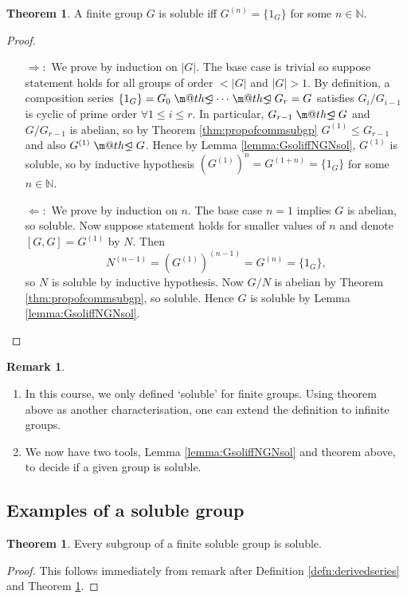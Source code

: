 \documentclass[a4paper]{article}
\makeatletter
\DeclareRobustCommand{\pns}{\mathrel{\text{$\m@th\proper@ideal$}}}
\newcommand{\proper@ideal}{%
  \ooalign{$\lneq$\cr\raise.22ex\hbox{$\lhd$}\cr}%
}
\newcommand{\N}{\mathbb{N}}
\theoremstyle{definition}
\newtheorem{thm}[defn]{Theorem}
\newtheorem*{remark}{Remark}
\makeatother
\begin{document}
\begin{thm}
\label{thm:GsoliffGneq1}
A finite group $G$ is soluble iff $G^{(n)}=\{1_G\}$ for some $n\in\N$.
\end{thm}
\begin{proof}
\begin{itemize}
\item[$\Rightarrow:$] We prove by induction on $|G|$. The base case is trivial so suppose statement holds for all groups of order $<|G|$ and $|G|>1$. By definition, a composition series $\{1_G\}=G_0\pns\cdots\pns G_r=G$ satisfies $G_i/G_{i-1}$ is cyclic of prime order $\forall 1\leq i\leq r$. In particular, $G_{r-1}\pns G$ and $G/G_{r-1}$ is abelian, so by Theorem \ref{thm:propofcommsubgp} $G^{(1)}\leq G_{r-1}$ and also $G^{(1)}\pns G$. Hence by Lemma \ref{lemma:GsoliffNGNsol}, $G^{(1)}$ is soluble, so by inductive hypothesis $\left(G^{(1)}\right)^n=G^{(1+n)}=\{1_G\}$ for some $n\in\N$.
\item[$\Leftarrow:$] We prove by induction on $n$. The base case $n=1$ implies $G$ is abelian, so soluble. Now suppose statement holds for smaller values of $n$ and denote $[G,G]=G^{(1)}$ by $N$. Then
\[
N^{(n-1)}=\left(G^{(1)}\right)^{(n-1)}=G^{(n)}=\{1_G\},
\]
so $N$ is soluble by inductive hypothesis. Now $G/N$ is abelian by Theorem \ref{thm:propofcommsubgp}, so soluble. Hence $G$ is soluble by Lemma \ref{lemma:GsoliffNGNsol}.
\end{itemize}
\end{proof}

\begin{remark}
\begin{enumerate}
\item In this course, we only defined `soluble' for finite groups. Using theorem above as another characterisation, one can extend the definition to infinite groups.
\item We now have two tools, Lemma \ref{lemma:GsoliffNGNsol} and theorem above, to decide if a given group is soluble.
\end{enumerate}
\end{remark}

\subsection{Examples of a soluble group}
\begin{thm}
\label{thm:subgpofsolissol}
Every subgroup of a finite soluble group is soluble.
\end{thm}
\begin{proof}
This follows immediately from remark after Definition \ref{defn:derivedseries} and Theorem \ref{thm:GsoliffGneq1}.
\end{proof}
\end{document}
